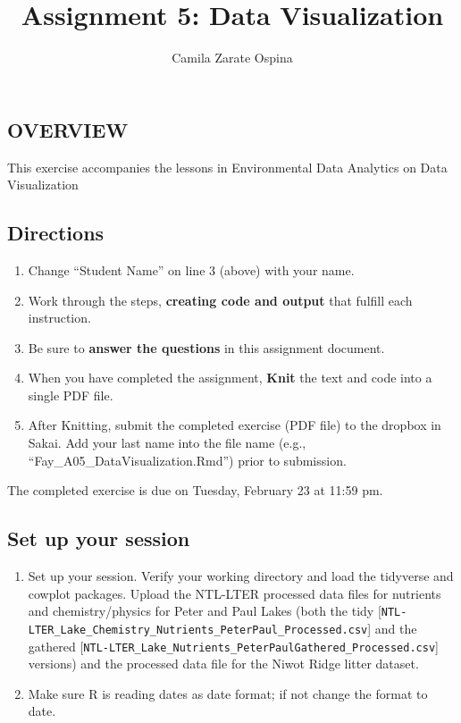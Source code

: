 \documentclass[
]{article}
\title{Assignment 5: Data Visualization}
\author{Camila Zarate Ospina}
\date{}
\providecommand{\tightlist}{%
  \setlength{\itemsep}{0pt}\setlength{\parskip}{0pt}}
\begin{document}
\maketitle

\hypertarget{overview}{%
\subsection{OVERVIEW}\label{overview}}

This exercise accompanies the lessons in Environmental Data Analytics on
Data Visualization

\hypertarget{directions}{%
\subsection{Directions}\label{directions}}

\begin{enumerate}
\def\labelenumi{\arabic{enumi}.}
\tightlist
\item
  Change ``Student Name'' on line 3 (above) with your name.
\item
  Work through the steps, \textbf{creating code and output} that fulfill
  each instruction.
\item
  Be sure to \textbf{answer the questions} in this assignment document.
\item
  When you have completed the assignment, \textbf{Knit} the text and
  code into a single PDF file.
\item
  After Knitting, submit the completed exercise (PDF file) to the
  dropbox in Sakai. Add your last name into the file name (e.g.,
  ``Fay\_A05\_DataVisualization.Rmd'') prior to submission.
\end{enumerate}

The completed exercise is due on Tuesday, February 23 at 11:59 pm.

\hypertarget{set-up-your-session}{%
\subsection{Set up your session}\label{set-up-your-session}}

\begin{enumerate}
\def\labelenumi{\arabic{enumi}.}
\item
  Set up your session. Verify your working directory and load the
  tidyverse and cowplot packages. Upload the NTL-LTER processed data
  files for nutrients and chemistry/physics for Peter and Paul Lakes
  (both the tidy
  {[}\texttt{NTL-LTER\_Lake\_Chemistry\_Nutrients\_PeterPaul\_Processed.csv}{]}
  and the gathered
  {[}\texttt{NTL-LTER\_Lake\_Nutrients\_PeterPaulGathered\_Processed.csv}{]}
  versions) and the processed data file for the Niwot Ridge litter
  dataset.
\item
  Make sure R is reading dates as date format; if not change the format
  to date.
\end{enumerate}
\end{document}
